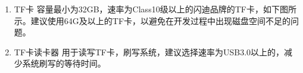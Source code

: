 \begin{enumerate}
\def\labelenumi{\arabic{enumi}.}
\item
  TF卡
  容量最小为32GB，速率为Class10级以上的闪迪品牌的TF卡，如下图所示。建议使用64G及以上的TF卡，以避免在开发过程中出现磁盘空间不足的问题。
\item
  TF卡读卡器
  用于读写TF卡，刷写系统，建议选择速率为USB3.0以上的，减少系统刷写的等待时间。

\end{enumerate}
